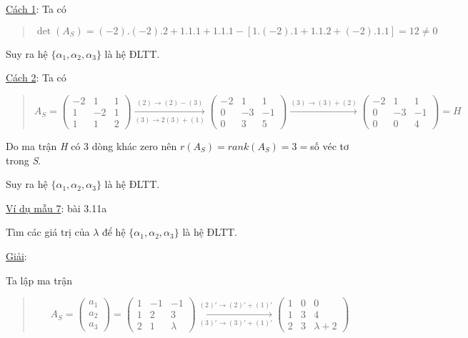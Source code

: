 \documentclass[12pt,a4paper]{article}
\begin{document}
\ul{Cách 1}: Ta có

\begin{quote}
\[ \det(A_S) = (-2).(-2).2 + 1.1.1 + 1.1.1 - [1.(-2).1 + 1.1.2 + (-2).1.1] = 12 \neq 0 \]
\end{quote}

Suy ra hệ $\{\alpha_1, \alpha_2, \alpha_3\}$ là
hệ ĐLTT.

\ul{Cách 2}: Ta có

\begin{quote}
\[ A_S = \begin{pmatrix} -2 & 1 & 1 \\ 1 & -2 & 1 \\ 1 & 1 & 2 \end{pmatrix} \xrightarrow[(3) \rightarrow 2(3) + (1)]{(2) \rightarrow (2) - (3)} \begin{pmatrix} -2 & 1 & 1 \\ 0 & -3 & -1 \\ 0 & 3 & 5 \end{pmatrix} \xrightarrow{(3) \rightarrow (3) + (2)} \begin{pmatrix} -2 & 1 & 1 \\ 0 & -3 & -1 \\ 0 & 0 & 4 \end{pmatrix} = H \]
\end{quote}

Do ma trận \emph{H} có 3 dòng khác zero nên
$r(A_S) = rank(A_S) = 3 = $số véc tơ trong
\emph{S}.

Suy ra hệ $\{\alpha_1, \alpha_2, \alpha_3\}$ là
hệ ĐLTT.

\ul{Ví dụ mẫu 7}: bài 3.11a

Tìm các giá trị của
$\lambda$ để hệ
$\{\alpha_1, \alpha_2, \alpha_3\}$ là hệ ĐLTT.

\ul{Giải}:

Ta lập ma trận

\begin{quote}
\[ A_S = \begin{pmatrix} a_1 \\ a_2 \\ a_3 \end{pmatrix} = \begin{pmatrix} 1 & -1 & -1 \\ 1 & 2 & 3 \\ 2 & 1 & \lambda \end{pmatrix} \xrightarrow[(3)' \rightarrow (3)' + (1)']{(2)' \rightarrow (2)' + (1)'} \begin{pmatrix} 1 & 0 & 0 \\ 1 & 3 & 4 \\ 2 & 3 & \lambda + 2 \end{pmatrix} \]
\end{quote}
\end{document}
